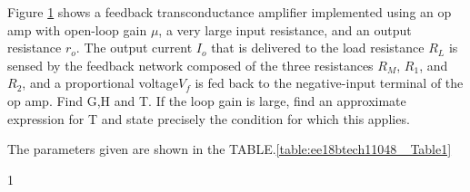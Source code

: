 Figure \ref{fig:ee18btech11048_original_circuit} shows a feedback transconductance
amplifier implemented using an op amp with open-loop gain $\mu$, a very large input resistance, and an output resistance $r_{o}$.
The output current $I_{o}$ that is delivered to the load resistance $R_{L}$
is sensed by the feedback network composed of the three
resistances $R_{M}$, $R_{1}$, and $R_{2}$, and a proportional voltage$V_{f}$
is fed back to the negative-input terminal of the op amp.
Find G,H and T. If the loop gain is large, find an approximate expression for T
and state precisely the condition for which this applies.
\begin{figure}[!ht]
	\begin{center}
		\resizebox{\columnwidth}{!}{}
	\end{center}
\caption{}
\label{fig:ee18btech11048_original_circuit}
\end{figure}
The parameters given are shown in the TABLE.\ref{table:ee18btech11048_ Table1}
\begin{table}[!ht]
\centering

\caption{1}
\label{table:ee18btech11048_ Table1}
\end{table}

